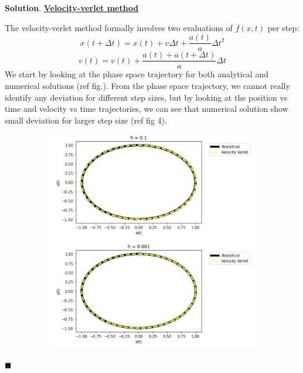 \documentclass[12pt]{article}
\renewcommand{\=}[1]{\stackrel{#1}{=}} %
\theoremstyle{definition}
\newenvironment{s}{%
        \begin{trivlist} \item \textbf{Solution}. }{%
            \hspace*{\fill} $\blacksquare$\end{trivlist}}%
\begin{document}
\begin{s}
\underline{\bf{Velocity-verlet method}}
\par The velocity-verlet method formally involves two evaluations of $f(x,t)$ per step:
\begin{equation}
   x(t + \Delta t) = x(t) + v \Delta t + \frac{a(t)} {a} \Delta t^2 
\end{equation}
%
\begin{equation}
   v(t) = v(t)  + \frac{a(t) + a(t + \Delta t)} {a} \Delta t 
\end{equation}
%
We start by looking at the phase space trajectory for both analytical and numerical solutions (ref fig.). From the phase space trajectory, we cannot really identify any deviation for different step sizes, but by looking at the position vs time and velocity vs time trajectories, we can see that numerical solution show small deviation for larger step size (ref fig 4).
%
%
\begin{figure}
\centering
\begin{subfigure}{.5\textwidth}
  \centering
  \includegraphics[width=.9\linewidth]{pic4.png}
  \caption{}
  \label{fig:sub1}
\end{subfigure}%
\begin{subfigure}{.5\textwidth}
  \centering

\end{subfigure}
\end{figure}
\end{s}
\end{document}
